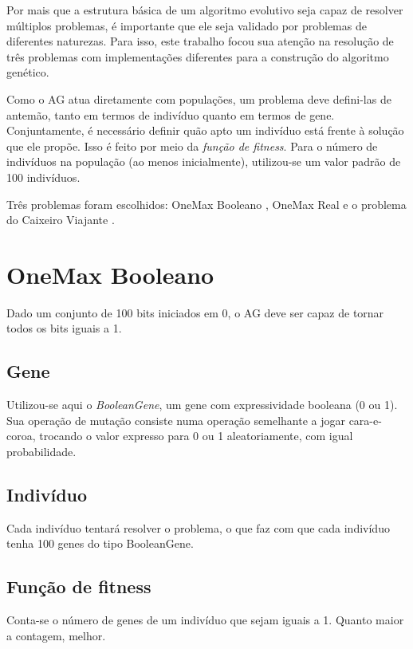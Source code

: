 \label{2_problemas}

Por mais que a estrutura básica de um algoritmo evolutivo seja capaz de resolver múltiplos problemas, é importante que ele seja validado por problemas de diferentes naturezas. Para isso, este trabalho focou sua atenção na resolução de três problemas com implementações diferentes para a construção do algoritmo genético.

Como o AG atua diretamente com populações, um problema deve defini-las de antemão, tanto em termos de indivíduo quanto em termos de gene. Conjuntamente, é necessário definir quão apto um indivíduo está frente à solução que ele propõe. Isso é feito por meio da \emph{função de fitness}. Para o número de indivíduos na população (ao menos inicialmente), utilizou-se um valor padrão de 100 indivíduos.

Três problemas foram escolhidos: OneMax Booleano \cite{giguere1998population}, OneMax Real e o problema do Caixeiro Viajante \cite{applegate2011traveling}.

\section{OneMax Booleano}

Dado um conjunto de 100 bits iniciados em 0, o AG deve ser capaz de tornar todos os bits iguais a 1.

\subsection*{Gene}

Utilizou-se aqui o \emph{BooleanGene}, um gene com expressividade booleana (0 ou 1). Sua operação de mutação consiste numa operação semelhante a jogar cara-e-coroa, trocando o valor expresso para 0 ou 1 aleatoriamente, com igual probabilidade.

\subsection*{Indivíduo}

Cada indivíduo tentará resolver o problema, o que faz com que cada indivíduo tenha 100 genes do tipo BooleanGene.

\subsection*{Função de fitness}

Conta-se o número de genes de um indivíduo que sejam iguais a 1. Quanto maior a contagem, melhor.

